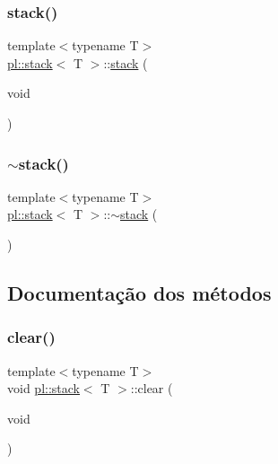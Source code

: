 \subsubsection{\texorpdfstring{stack()}{stack()}}
{\footnotesize\ttfamily template$<$typename T$>$ \\
\hyperlink{classpl_1_1stack}{pl\+::stack}$<$ T $>$\+::\hyperlink{classpl_1_1stack}{stack} (\begin{DoxyParamCaption}\item[{void}]{ }\end{DoxyParamCaption})\hspace{0.3cm}{\ttfamily [inline]}}

\mbox{\label{classpl_1_1stack_acc3e2e498b934dfed18fa60440373960}} 
\subsubsection{\texorpdfstring{$\sim$stack()}{~stack()}}
{\footnotesize\ttfamily template$<$typename T$>$ \\
\hyperlink{classpl_1_1stack}{pl\+::stack}$<$ T $>$\+::$\sim$\hyperlink{classpl_1_1stack}{stack} (\begin{DoxyParamCaption}{ }\end{DoxyParamCaption})\hspace{0.3cm}{\ttfamily [inline]}}



\subsection{Documentação dos métodos}
\mbox{\label{classpl_1_1stack_a97f9f75d2c40c2c68770dde9b4c42254}} 
\subsubsection{\texorpdfstring{clear()}{clear()}}
{\footnotesize\ttfamily template$<$typename T$>$ \\
void \hyperlink{classpl_1_1stack}{pl\+::stack}$<$ T $>$\+::clear (\begin{DoxyParamCaption}\item[{void}]{ }\end{DoxyParamCaption})\hspace{0.3cm}{\ttfamily [inline]}}


